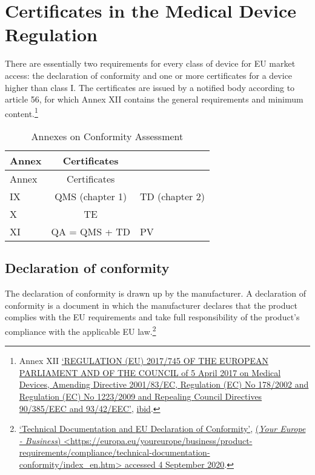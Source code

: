 \documentclass[
]{scrartcl}
\begin{document}
\hypertarget{sec:Certificates-in-the}{%
\section{Certificates in the Medical Device Regulation}\label{sec:Certificates-in-the}}

There are essentially two requirements for every class of device for EU market access: the declaration of conformity and one or more certificates for a device higher than class I. The certificates are issued by a notified body according to article 56, for which Annex XII contains the general requirements and minimum content.\footnote{Annex XII \protect\hyperlink{ref-REGULATIONEU2017a}{{`{REGULATION} ({EU}) 2017/745 {OF THE EUROPEAN PARLIAMENT AND OF THE COUNCIL} of 5 {April} 2017 on Medical Devices, Amending {Directive} 2001/83/{EC}, {Regulation} ({EC}) {No} 178/2002 and {Regulation} ({EC}) {No} 1223/2009 and Repealing {Council Directives} 90/385/{EEC} and 93/42/{EEC}'}}, \protect\hyperlink{ref-REGULATIONEU2017a}{ibid}.}

\begin{longtable}[]{@{}lcl@{}}
\caption{Annexes on Conformity Assessment}\tabularnewline
\toprule
Annex & Certificates & \\
\midrule
\endfirsthead
\toprule
Annex & Certificates & \\
\midrule
\endhead
IX & QMS (chapter 1) & TD (chapter 2) \\
X & TE & \\
XI & QA = QMS + TD & PV \\
\bottomrule
\end{longtable}

\hypertarget{declaration-of-conformity}{%
\subsection{Declaration of conformity}\label{declaration-of-conformity}}

The declaration of conformity is drawn up by the manufacturer. A declaration of conformity is a document in which the manufacturer declares that the product complies with the EU requirements and take full responsibility of the product's compliance with the applicable EU law.\footnote{\protect\hyperlink{ref-TechnicalDocumentationEU}{{`Technical Documentation and {EU} Declaration of Conformity'}}, \protect\hyperlink{ref-TechnicalDocumentationEU}{(\emph{Your Europe - Business}) \textless{}\url{https://europa.eu/youreurope/business/product-requirements/compliance/technical-documentation-conformity/index_en.htm}\textgreater{} accessed 4 September 2020}.}
\end{document}
